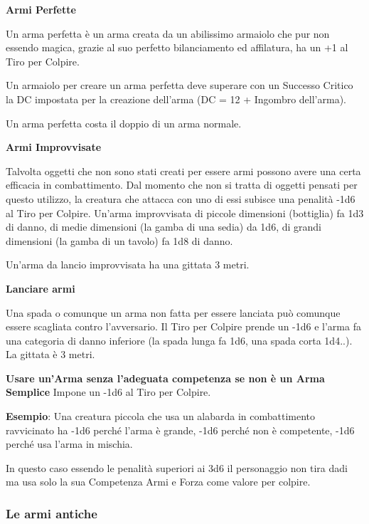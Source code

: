 \begin{multicols}{2}
\medskip

\textbf{Armi Perfette}

Un arma perfetta è un arma creata da un abilissimo armaiolo che pur non essendo magica, grazie al suo perfetto bilanciamento ed affilatura, ha un +1 al Tiro per Colpire.

Un armaiolo per creare un arma perfetta deve superare con un Successo Critico la DC impostata per la creazione dell'arma (DC = 12 + Ingombro dell'arma).

Un arma perfetta costa il doppio di un arma normale.

\textbf{Armi Improvvisate}\label{armaimprovvisata}\hypertarget{armaimprovvisata}{}

Talvolta oggetti che non sono stati creati per essere armi possono avere una certa efficacia in combattimento. Dal momento che non si tratta di oggetti pensati per questo utilizzo, la creatura che attacca con uno di essi subisce una penalità -1d6 al Tiro per Colpire. Un'arma improvvisata di piccole dimensioni (bottiglia) fa 1d3 di danno, di medie dimensioni (la gamba di una sedia) da 1d6, di grandi dimensioni (la gamba di un tavolo) fa 1d8 di danno.

Un'arma da lancio improvvisata ha una gittata 3 metri.

\medskip

\textbf{Lanciare armi}

Una spada o comunque un arma non fatta per essere lanciata può comunque essere scagliata contro l'avversario. Il Tiro per Colpire prende un -1d6 e l'arma fa una categoria di danno inferiore (la spada lunga fa 1d6, una spada corta 1d4..). La gittata è 3 metri.

\medskip

\textbf{Usare un'Arma senza l'adeguata competenza se non è un Arma Semplice} Impone un -1d6 al Tiro per Colpire.

\textbf{Esempio}: Una creatura piccola che usa un alabarda in combattimento ravvicinato ha -1d6 perché l'arma è grande, -1d6 perché non è competente, -1d6 perché usa l'arma in mischia.

In questo caso essendo le penalità superiori ai 3d6 il personaggio non tira dadi ma usa solo la sua Competenza Armi e Forza come valore per colpire.

\subsubsection{Le armi antiche}


\end{multicols}
